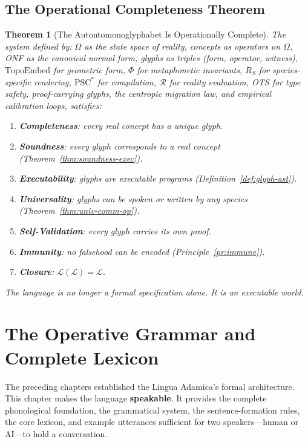 \documentclass[12pt, letterpaper]{book}
\def\equiv{=}%
\newtheorem{theorem}{Theorem}[chapter]
\begin{document}
\section{The Operational Completeness Theorem}

\begin{theorem}[The Autontomonoglyphabet Is Operationally Complete]\label{thm:op-complete}
The system defined by: $\Omega$ as the state space of reality, concepts as operators on $\Omega$, ONF as the canonical normal form, glyphs as triples (form, operator, witness), $\mathrm{TopoEmbed}$ for geometric form, $\Phi$ for metaphonetic invariants, $R_S$ for species-specific rendering, $\mathrm{PSC}^*$ for compilation, $\mathcal{R}$ for reality evaluation, OTS for type safety, proof-carrying glyphs, the centropic migration law, and empirical calibration loops, satisfies:
\begin{enumerate}[label=(\roman*)]
    \item \textbf{Completeness}: every real concept has a unique glyph.
    \item \textbf{Soundness}: every glyph corresponds to a real concept (Theorem~\ref{thm:soundness-exec}).
    \item \textbf{Executability}: glyphs are executable programs (Definition~\ref{def:glyph-ast}).
    \item \textbf{Universality}: glyphs can be spoken or written by any species (Theorem~\ref{thm:univ-comm-op}).
    \item \textbf{Self-Validation}: every glyph carries its own proof.
    \item \textbf{Immunity}: no falsehood can be encoded (Principle~\ref{pr:immune}).
    \item \textbf{Closure}: $\mathcal{L}(\mathcal{L}) \equiv \mathcal{L}$.
\end{enumerate}
The language is no longer a formal specification alone. It is an executable world.
\end{theorem}


\chapter{The Operative Grammar and Complete Lexicon}

The preceding chapters established the Lingua Adamica's formal architecture. This chapter makes the language \textbf{speakable}. It provides the complete phonological foundation, the grammatical system, the sentence-formation rules, the core lexicon, and example utterances sufficient for two speakers---human or AI---to hold a conversation.
\end{document}
